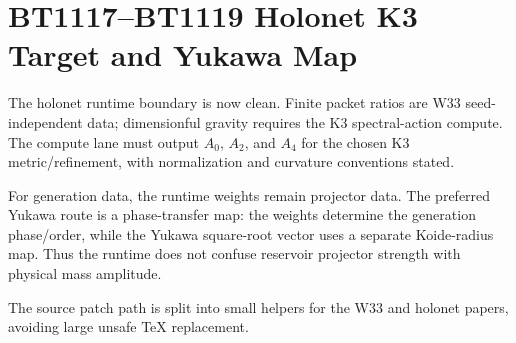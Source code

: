 \section{BT1117--BT1119 Holonet K3 Target and Yukawa Map}
\label{sec:bt1117-bt1119-holonet-k3-yukawa-patch-report}

The holonet runtime boundary is now clean.  Finite packet ratios are W33 seed-independent data; dimensionful gravity requires the K3 spectral-action compute.  The compute lane must output $A_0$, $A_2$, and $A_4$ for the chosen K3 metric/refinement, with normalization and curvature conventions stated.

For generation data, the runtime weights remain projector data.  The preferred Yukawa route is a phase-transfer map: the weights determine the generation phase/order, while the Yukawa square-root vector uses a separate Koide-radius map.  Thus the runtime does not confuse reservoir projector strength with physical mass amplitude.

The source patch path is split into small helpers for the W33 and holonet papers, avoiding large unsafe TeX replacement.
